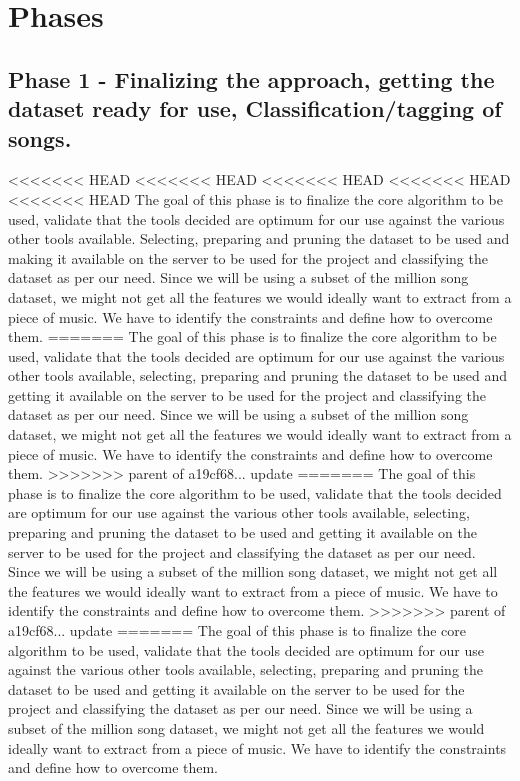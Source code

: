 \documentclass{article}
\begin{document}
\section{Phases}

\subsection{Phase 1 - Finalizing the approach, getting the dataset ready for use, Classification/tagging of songs.}
<<<<<<< HEAD
<<<<<<< HEAD
<<<<<<< HEAD
<<<<<<< HEAD
<<<<<<< HEAD
The goal of this phase is to finalize the core algorithm to be used, validate that the tools decided are optimum for our use against the various other tools available. Selecting, preparing and pruning the dataset to be used and making it available on the server to be used for the project and classifying the dataset as per our need. Since we will be using a subset of the million song dataset, we might not get all the features we would ideally want to extract from a piece of music. We have to identify the constraints and define how to overcome them.
=======
The goal of this phase is to finalize the core algorithm to be used, validate that the tools decided are optimum for our use against the various other tools available, selecting, preparing and pruning the dataset to be used and getting it available on the server to be used for the project and classifying the dataset as per our need. Since we will be using a subset of the million song dataset, we might not get all the features we would ideally want to extract from a piece of music. We have to identify the constraints and define how to overcome them.
>>>>>>> parent of a19cf68... update
=======
The goal of this phase is to finalize the core algorithm to be used, validate that the tools decided are optimum for our use against the various other tools available, selecting, preparing and pruning the dataset to be used and getting it available on the server to be used for the project and classifying the dataset as per our need. Since we will be using a subset of the million song dataset, we might not get all the features we would ideally want to extract from a piece of music. We have to identify the constraints and define how to overcome them.
>>>>>>> parent of a19cf68... update
=======
The goal of this phase is to finalize the core algorithm to be used, validate that the tools decided are optimum for our use against the various other tools available, selecting, preparing and pruning the dataset to be used and getting it available on the server to be used for the project and classifying the dataset as per our need. Since we will be using a subset of the million song dataset, we might not get all the features we would ideally want to extract from a piece of music. We have to identify the constraints and define how to overcome them.
\end{document}
